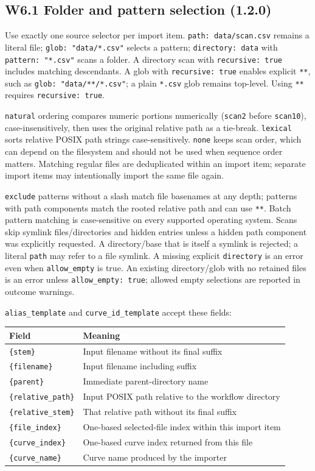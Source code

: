 \documentclass[
  10pt,
  a4paper,
  oneside]{scrreprt}
\begin{document}
\hypertarget{w6.1-folder-and-pattern-selection-1.2.0}{%
\subsection{W6.1 Folder and pattern selection
(1.2.0)}\label{w6.1-folder-and-pattern-selection-1.2.0}}

Use exactly one source selector per import item.
\texttt{path:\ data/scan.csv} remains a literal file;
\texttt{glob:\ "data/*.csv"} selects a pattern;
\texttt{directory:\ data} with \texttt{pattern:\ "*.csv"} scans a
folder. A directory scan with \texttt{recursive:\ true} includes
matching descendants. A glob with \texttt{recursive:\ true} enables
explicit \texttt{**}, such as \texttt{glob:\ "data/**/*.csv"}; a plain
\texttt{*.csv} glob remains top-level. Using \texttt{**} requires
\texttt{recursive:\ true}.

\texttt{natural} ordering compares numeric portions numerically
(\texttt{scan2} before \texttt{scan10}), case-insensitively, then uses
the original relative path as a tie-break. \texttt{lexical} sorts
relative POSIX path strings case-sensitively. \texttt{none} keeps scan
order, which can depend on the filesystem and should not be used when
sequence order matters. Matching regular files are deduplicated within
an import item; separate import items may intentionally import the same
file again.

\texttt{exclude} patterns without a slash match file basenames at any
depth; patterns with path components match the rooted relative path and
can use \texttt{**}. Batch pattern matching is case-sensitive on every
supported operating system. Scans skip symlink files/directories and
hidden entries unless a hidden path component was explicitly requested.
A directory/base that is itself a symlink is rejected; a literal
\texttt{path} may refer to a file symlink. A missing explicit
\texttt{directory} is an error even when \texttt{allow\_empty} is true.
An existing directory/glob with no retained files is an error unless
\texttt{allow\_empty:\ true}; allowed empty selections are reported in
outcome warnings.

\texttt{alias\_template} and \texttt{curve\_id\_template} accept these
fields:

\begin{longtable}[]{@{}ll@{}}
\toprule
Field & Meaning\tabularnewline
\midrule
\endhead
\texttt{\{stem\}} & Input filename without its final
suffix\tabularnewline
\texttt{\{filename\}} & Input filename including suffix\tabularnewline
\texttt{\{parent\}} & Immediate parent-directory name\tabularnewline
\texttt{\{relative\_path\}} & Input POSIX path relative to the workflow
directory\tabularnewline
\texttt{\{relative\_stem\}} & That relative path without its final
suffix\tabularnewline
\texttt{\{file\_index\}} & One-based selected-file index within this
import item\tabularnewline
\texttt{\{curve\_index\}} & One-based curve index returned from this
file\tabularnewline
\texttt{\{curve\_name\}} & Curve name produced by the
importer\tabularnewline
\bottomrule
\end{longtable}
\end{document}
